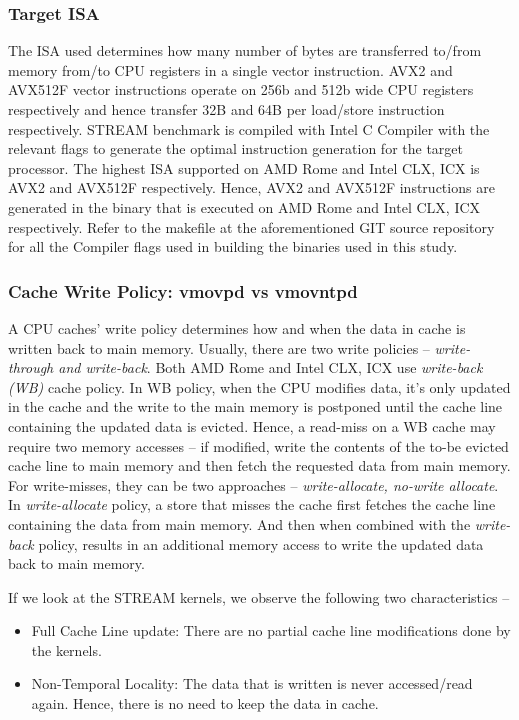 \documentclass{article}
\begin{document}
\subsubsection{Target ISA}
The ISA used determines how many number of bytes are transferred to/from memory from/to CPU registers in a single vector instruction. AVX2 and AVX512F vector instructions operate on 256b and 512b wide CPU registers respectively and hence transfer 32B and 64B per load/store instruction respectively. STREAM benchmark is compiled with Intel C Compiler with the relevant flags to generate the optimal instruction generation for the target processor. The highest ISA supported on AMD Rome and Intel CLX, ICX is AVX2 and AVX512F respectively. Hence, AVX2 and AVX512F instructions are generated in the binary that is executed on AMD Rome and Intel CLX, ICX respectively. Refer to the makefile at the aforementioned GIT source repository for all the Compiler flags used in building the binaries used in this study.

\subsubsection{Cache Write Policy: vmovpd vs vmovntpd}
A CPU caches' write policy determines how and when the data in cache is written back to main memory. Usually, there are two write policies -- \textit{write-through and write-back}. Both AMD Rome and Intel CLX, ICX use \textit{write-back (WB)} cache policy. In WB policy, when the CPU modifies data, it's only updated in the cache and the write to the main memory is postponed until the cache line containing the updated data is evicted. Hence, a read-miss on a WB cache may require two memory accesses -- if modified, write the contents of the to-be evicted cache line to main memory and then fetch the requested data from main memory. For write-misses, they can be two approaches -- \textit{write-allocate, no-write allocate}. In \textit{write-allocate} policy, a store that misses the cache first fetches the cache line containing the data from main memory. And then when combined with the \textit{write-back} policy, results in an additional memory access to write the updated data back to main memory.

If we look at the STREAM kernels, we observe the following two characteristics --
\begin{itemize}
\item Full Cache Line update: There are no partial cache line modifications done by the kernels.
\item Non-Temporal Locality: The data that is written is never accessed/read again. Hence, there is no need to keep the data in cache.
\end{itemize}
\end{document}
